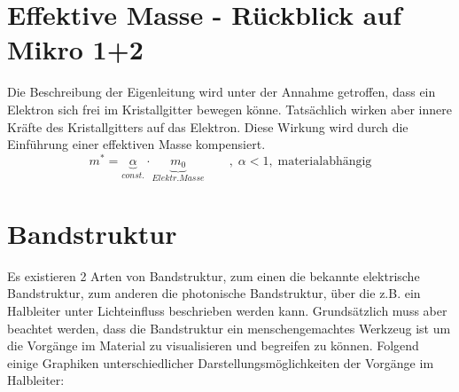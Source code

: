 \section{Effektive Masse - Rückblick auf Mikro 1+2}
Die Beschreibung der Eigenleitung wird unter der Annahme getroffen, dass ein Elektron sich frei im Kristallgitter bewegen könne. Tatsächlich wirken aber innere Kräfte des Kristallgitters auf das Elektron. Diese Wirkung wird durch die Einführung einer effektiven Masse kompensiert.
	\begin{equation}
		m^* = \underbrace{\alpha}_{const.} \cdot \underbrace{m_0}_{Elektr. Masse} \qquad ,\; \alpha < 1,\; \text{materialabhängig}
	\end{equation}
	
	\section{Bandstruktur}
	Es existieren 2 Arten von Bandstruktur, zum einen die bekannte elektrische Bandstruktur, zum anderen die photonische Bandstruktur, über die z.B. ein Halbleiter unter Lichteinfluss beschrieben werden kann. Grundsätzlich muss aber beachtet werden, dass die Bandstruktur ein menschengemachtes Werkzeug ist um die Vorgänge im Material zu visualisieren und begreifen zu können. Folgend einige Graphiken unterschiedlicher Darstellungsmöglichkeiten der Vorgänge im Halbleiter:
